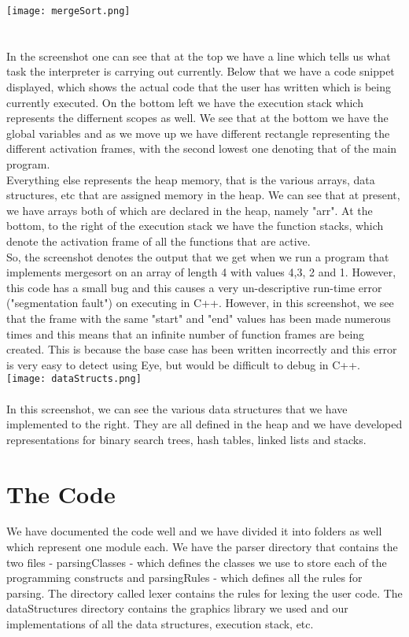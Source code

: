\documentclass{article}
\begin{document}
\texttt{[image: mergeSort.png]}
\\\\\\
In the screenshot one can see that at the top we have a line which tells us what task the interpreter is carrying out currently. Below that we have a code snippet displayed, which shows the actual code that the user has written which is being currently executed. On the bottom left we have the execution stack which represents the differnent scopes as well. We see that at the bottom we have the global variables and as we move up we have different rectangle representing the different activation frames, with the second lowest one denoting that of the main program.\\
Everything else represents the heap memory, that is the various arrays, data structures, etc that are assigned memory in the heap. We can see that at present, we have arrays both of which are declared in the heap, namely "arr". At the bottom, to the right of the execution stack we have the function stacks, which denote the activation frame of all the functions that are active. \\
So, the screenshot denotes the output that we get when we run a program that implements mergesort on an array of length 4 with values 4,3, 2 and 1. However, this code has a small bug and this causes a very un-descriptive run-time error ("segmentation fault") on executing in C++. However, in this screenshot, we see that the frame with the same "start" and "end" values has been made numerous times and this means that an infinite number of function frames are being created. This is because the base case has been written incorrectly and this error is very easy to detect using Eye, but would be difficult to debug in C++.
\\

\texttt{[image: dataStructs.png]}
\\ \\
In this screenshot, we can see the various data structures that we have implemented to the right. They are all defined in the heap and we have developed representations for binary search trees, hash tables, linked lists and stacks.

\section {The Code}
We have documented the code well and we have divided it into folders as well which represent one module each. We have the parser directory that contains the two files - parsingClasses - which defines the classes we use to store each of the programming constructs and parsingRules - which defines all the rules for parsing. The directory called lexer contains the rules for lexing the user code. The dataStructures directory contains the graphics library we used and our implementations of all the data structures, execution stack, etc.
\end{document}
